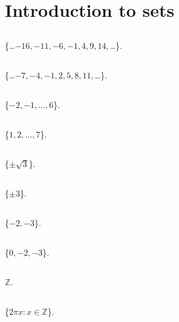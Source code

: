 \section{Introduction to sets}
   \subsection{} \{\ldots $-16,-11,-6,-1,4,9,14,$\ldots \}.
   \subsection{} \{\ldots $-7,-4,-1,2,5,8,11,$\ldots \}.
   \subsection{} \{$-2,-1,\ldots,6$\}.
   \subsection{} \{$1,2,\ldots,7$\}.
   \subsection{} \{$\pm\sqrt{3}$\}.
   \subsection{} \{$\pm 3$\}.
   \subsection{} \{$-2,-3$\}.
   \subsection{} \{$0,-2,-3$\}.
   \subsection{} $\mathbb{Z}$.
   \subsection{} \{$2\pi x : x \in \mathbb{Z}$\}.
